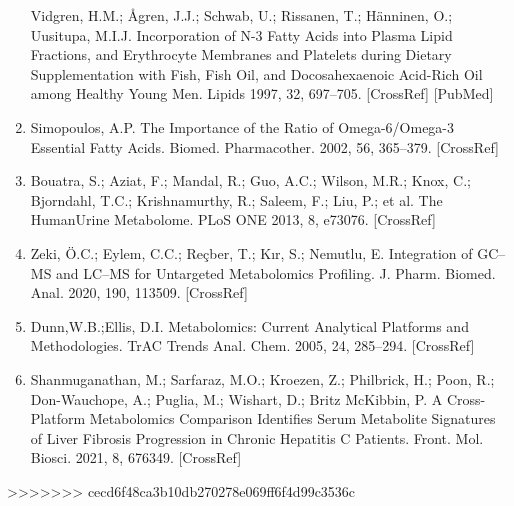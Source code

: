 \documentclass[journal=jacsat,manuscript=article]{achemso}
\begin{document}
\begin{enumerate}
  Vidgren, H.M.; Ågren, J.J.; Schwab, U.; Rissanen, T.; Hänninen, O.;
  Uusitupa, M.I.J. Incorporation of N-3 Fatty Acids into Plasma Lipid
  Fractions, and Erythrocyte Membranes and Platelets during Dietary
  Supplementation with Fish, Fish Oil, and Docosahexaenoic Acid-Rich Oil
  among Healthy Young Men. Lipids 1997, 32, 697--705. {[}CrossRef{]}
  {[}PubMed{]}
\item
  Simopoulos, A.P. The Importance of the Ratio of Omega-6/Omega-3
  Essential Fatty Acids. Biomed. Pharmacother. 2002, 56, 365--379.
  {[}CrossRef{]}
\item
  Bouatra, S.; Aziat, F.; Mandal, R.; Guo, A.C.; Wilson, M.R.; Knox, C.;
  Bjorndahl, T.C.; Krishnamurthy, R.; Saleem, F.; Liu, P.; et al. The
  HumanUrine Metabolome. PLoS ONE 2013, 8, e73076. {[}CrossRef{]}
\item
  Zeki, Ö.C.; Eylem, C.C.; Reçber, T.; Kır, S.; Nemutlu, E. Integration
  of GC--MS and LC--MS for Untargeted Metabolomics Profiling. J. Pharm.
  Biomed. Anal. 2020, 190, 113509. {[}CrossRef{]}
\item
  Dunn,W.B.;Ellis, D.I. Metabolomics: Current Analytical Platforms and
  Methodologies. TrAC Trends Anal. Chem. 2005, 24, 285--294.
  {[}CrossRef{]}
\item
  Shanmuganathan, M.; Sarfaraz, M.O.; Kroezen, Z.; Philbrick, H.; Poon,
  R.; Don-Wauchope, A.; Puglia, M.; Wishart, D.; Britz McKibbin, P. A
  Cross-Platform Metabolomics Comparison Identifies Serum Metabolite
  Signatures of Liver Fibrosis Progression in Chronic Hepatitis C
  Patients. Front. Mol. Biosci. 2021, 8, 676349. {[}CrossRef{]}
\end{enumerate}
>>>>>>> cecd6f48ca3b10db270278e069ff6f4d99c3536c
\end{document}
